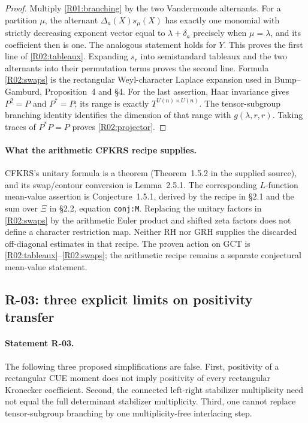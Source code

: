 \documentclass[11pt,a4paper]{article}
\theoremstyle{definition}\newtheorem{definition}{Definition}
\begin{document}
\begin{proof}
Multiply \eqref{R01:branching} by the two Vandermonde alternants.
For a partition $\mu$, the alternant $\Delta_a(X)s_\mu(X)$ has exactly one
monomial with strictly decreasing exponent vector equal to
$\lambda+\delta_a$ precisely when $\mu=\lambda$, and its coefficient then
is one. The analogous statement holds for $Y$. This proves the first line
of \eqref{R02:tableaux}. Expanding $s_r$ into semistandard tableaux and
the two alternants into their permutation terms proves the second line.
Formula \eqref{R02:swaps} is the rectangular Weyl-character Laplace expansion
used in Bump--Gamburd, Proposition~4 and \S4. For the last assertion,
Haar invariance gives $P^2=P$ and $P^*=P$; its range is exactly $T^{U(n)\times
U(n)}$. The tensor-subgroup branching identity identifies the dimension of
that range with $g(\lambda,r,r)$. Taking traces of $P^*P=P$ proves
\eqref{R02:projector}.
\end{proof}

\paragraph{What the arithmetic CFKRS recipe supplies.}
CFKRS's unitary formula is a theorem (Theorem~1.5.2 in the supplied source),
and its swap/contour conversion is Lemma~2.5.1. The corresponding
$L$-function mean-value assertion is Conjecture~1.5.1, derived by the
recipe in \S2.1 and the sum over $\Xi$ in \S2.2, equation
\nolinkurl{conj:M}. Replacing the unitary factors in \eqref{R02:swaps} by the
arithmetic Euler product and shifted zeta factors does not define a
character restriction map. Neither RH nor GRH supplies the discarded
off-diagonal estimates in that recipe. The proven action on GCT is
\eqref{R02:tableaux}--\eqref{R02:swaps}; the arithmetic recipe remains a
separate conjectural mean-value statement.

\subsection{R-03: three explicit limits on positivity transfer}

\paragraph{Statement R-03.}
The following three proposed simplifications are false.
First, positivity of a rectangular CUE moment does not imply positivity
of every rectangular Kronecker coefficient. Second, the connected
left-right stabilizer multiplicity need not equal the full determinant
stabilizer multiplicity. Third, one cannot replace tensor-subgroup
branching by one multiplicity-free interlacing step.
\end{document}
